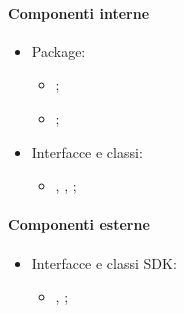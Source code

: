 \documentclass[../Funzionalita.tex]{subfiles}
\begin{document}
		\paragraph*{Componenti interne}
			\begin{itemize}
				\item Package:
				\begin{itemize}
					\item[] \model;
					\item[] \usersetting;
				\end{itemize}
				
				\item Interfacce e classi:
				\begin{itemize}
					\item[] \InformationManager, \InformationManagerImp, \Setting;
				\end{itemize}
			\end{itemize}
		
		\paragraph*{Componenti esterne}
			\begin{itemize}
				\item Interfacce e classi SDK:
				\begin{itemize}
					\item[] \SharedPreferences, \Log;
				\end{itemize}
			\end{itemize}
\end{document}
